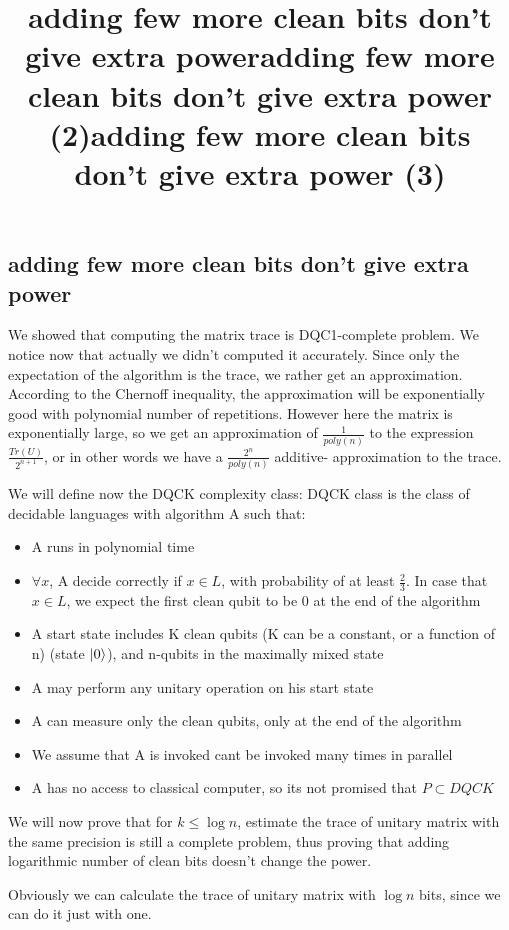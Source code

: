 \documentclass{article}
\begin{document}
\subsection{adding few more clean bits don't give extra power}
\title{adding few more clean bits don't give extra power}
We showed that computing the matrix trace is DQC1-complete problem.
We notice now that actually we didn't computed it accurately. Since only the expectation of the algorithm is the trace, we rather get an approximation. According to the Chernoff inequality, the approximation will be exponentially  good with polynomial number of repetitions. However here the matrix is exponentially large, so we get an approximation of $\frac{1}{poly(n)}$ to the expression $\frac{Tr(U)}{2^{n+1}}$, or  in other words we have a $\frac{2^{n}}{poly(n)}$ additive- approximation to the trace. 


\title{adding few more clean bits don't give extra power (2)}
We will define now the DQCK complexity class:
DQCK class is the class of decidable languages with algorithm A such that:
\begin{itemize}
\item A runs in polynomial time
\item $\forall x$, A decide correctly if $x \in L$, with probability of at least $\frac{2}{3}$. 
In case that $x \in L$, we expect the first clean qubit to be 0 at the end of the algorithm
\item A start state includes K clean qubits (K can be a constant, or a function of n) (state $\left\vert{0}\right\rangle$), and n-qubits in the maximally mixed state
\item A may perform any unitary operation on his start state
\item A can measure only the clean qubits, only at the end of the algorithm
\item We assume that A is invoked cant be invoked many times in parallel
\item A has no access to classical computer, so its not promised that $P \subset DQCK$ 
\end{itemize}  


\title{adding few more clean bits don't give extra power (3)}
We will now prove that for $k \leq \log{n}$, estimate the trace of unitary matrix with the same precision is still a complete problem, thus proving that adding logarithmic number of clean bits doesn't change the power. 

Obviously we can calculate the trace of unitary matrix with $\log{n}$ bits, since we can do it just with one. 
\end{document}
